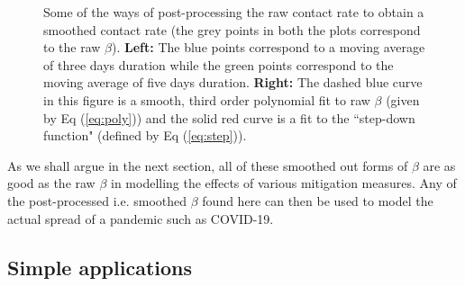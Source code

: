 \documentclass[aps,prd,10pt,twocolumn,nofootinbib]{revtex4-2}
\begin{document}
\begin{figure}[hbtp]
  \centering
  \hspace*{-1cm} 
  \quad
  \caption{
Some of the ways of post-processing the raw contact rate to obtain a smoothed contact rate 
(the grey points in both the plots correspond to the raw $\beta$).
{\bf Left:} 
The blue points correspond to a moving average of three days duration while the green points correspond to the moving average of five days duration. 
{\bf Right:}
The dashed blue curve in this figure is a smooth, third order polynomial fit to raw $\beta$ (given by Eq (\ref{eq:poly})) and the solid red curve is a fit to the ``step-down function" (defined by Eq (\ref{eq:step})).
}
   \label{smooth}
\end{figure}

As we shall argue in the next section, all of these smoothed out forms of $\beta$ are as good as the raw $\beta$ in modelling the effects of various mitigation measures.
Any of the post-processed i.e. smoothed $\beta$ found here can then be used to model the actual spread of a pandemic such as COVID-19. 

\subsection{Simple applications}
\end{document}

